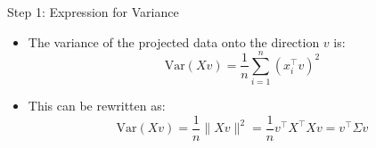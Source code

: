 \documentclass[serif, aspectratio=169]{beamer}
\begin{document}



\begin{frame}{Step 1: Expression for Variance}
    \begin{itemize}
        \item The variance of the projected data onto the direction \( v \) is:
        \[
        \text{Var}(Xv) = \frac{1}{n} \sum_{i=1}^{n} (x_i^\top v)^2
        \]
        \item This can be rewritten as:
        \[
        \text{Var}(Xv) = \frac{1}{n} \|Xv\|^2 = \frac{1}{n} v^\top X^\top X v = v^\top \Sigma v
        \]
    \end{itemize}
\end{frame}
\end{document}

